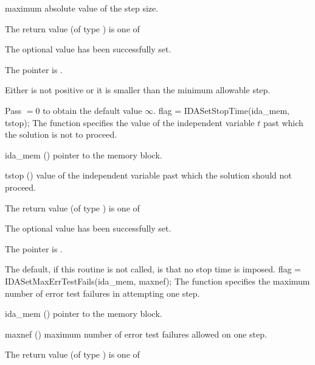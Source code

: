 {{\begin{args}
    maximum absolute value of the step size.
  \end{args}
}
{
  The return value  (of type ) is one of
  \begin{args}
  \item[\Id{IDA\_SUCCESS}] 
    The optional value has been successfully set.
  \item[\Id{IDA\_MEM\_NULL}]
    The  pointer is .
  \item[\Id{IDA\_ILL\_INPUT}]
    Either  is not positive or it is smaller than the minimum allowable
    step.
  \end{args}
}
{
  Pass $=0$ to obtain the default value $\infty$.
}
{
flag = IDASetStopTime(ida\_mem, tstop);
}
{
  The function  specifies the value of the
  independent variable $t$ past which the solution is not to proceed.
}
{
  \begin{args}
  \item[ida\_mem] ()
    pointer to the {\ida} memory block.
  \item[tstop] ()
    value of the independent variable past which the solution should
    not proceed.
  \end{args}
}
{
  The return value  (of type ) is one of
  \begin{args}
  \item[\Id{IDA\_SUCCESS}] 
    The optional value has been successfully set.
  \item[\Id{IDA\_MEM\_NULL}]
    The  pointer is .
  \end{args}
}
{
  The default, if this routine is not called, is that no stop time is imposed.
}
{
flag = IDASetMaxErrTestFails(ida\_mem, maxnef);
}
{
  The function  specifies the
  maximum number of error test failures in attempting one step.
}
{
  \begin{args}
  \item[ida\_mem] ()
    pointer to the {\ida} memory block.
  \item[maxnef] ()
    maximum number of error test failures allowed on one step.
  \end{args}
}
{
  The return value  (of type ) is one of
  \begin{args}
  \item[\Id{IDA\_SUCCESS}] 

\end{args}}}
